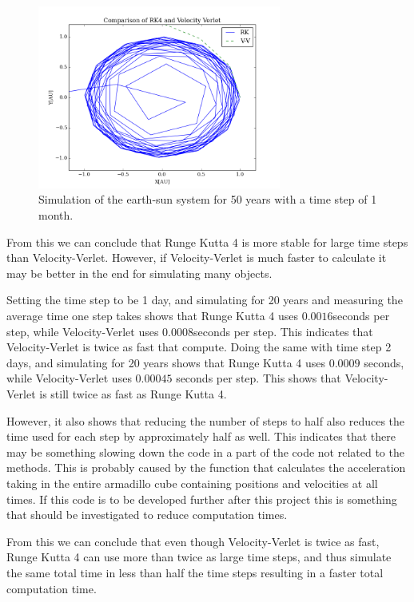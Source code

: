 \documentclass{aa}   %
\begin{document}
\begin{figure}[hbtp]
 \centering
 \includegraphics[width=80mm]{ES_1m_50y.png}
 \caption[]{\label{ES_1m_50y}
   Simulation of the earth-sun system for 50 years with a time step of 1 month.  
 }
\end{figure}

From this we can conclude that Runge Kutta 4 is more stable for large time steps than Velocity-Verlet. 
However, if Velocity-Verlet is much faster to calculate it may be better in the end for simulating many objects.

Setting the time step to be 1 day, and simulating for 20 years and measuring the average time one step takes shows that Runge Kutta 4 uses $0.0016$seconds per step, while Velocity-Verlet uses $0.0008$seconds per step. This indicates that Velocity-Verlet is twice as fast that compute. 
Doing the same with time step 2 days, and simulating for 20 years shows that Runge Kutta 4 uses $0.0009$ seconds, while Velocity-Verlet uses $0.00045$ seconds per step. This shows that Velocity-Verlet is still twice as fast as Runge Kutta 4.

However, it also shows that reducing the number of steps to half also reduces the time used for each step by approximately half as well. This indicates that there may be something slowing down the code in a part of the code not related to the methods. This is probably caused by the function that calculates the acceleration taking in the entire armadillo cube containing positions and velocities at all times. If this code is to be developed further after this project this is something that should be investigated to reduce computation times.

From this we can conclude that even though Velocity-Verlet is twice as fast, Runge Kutta 4 can use more than twice as large time steps, and thus simulate the same total time in less than half the time steps resulting in a faster total computation time. 
\end{document}
